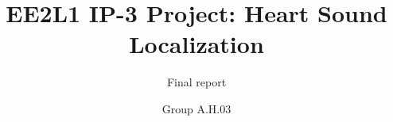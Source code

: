 \documentclass[whitelogo,oneside]{TUD-report2020}
\newcommand{\productName}{Final report}
\begin{document}
 




\frontmatter

\title[tudelft-white]{EE2L1 IP-3 Project: Heart Sound Localization}
\subtitle[tudelft-black]{\productName}
\author[tudelft-white]{Group A.H.03}




% 

% 

\tableofcontents

\mainmatter








\printbibliography


%
 
\appendix


\end{document}
